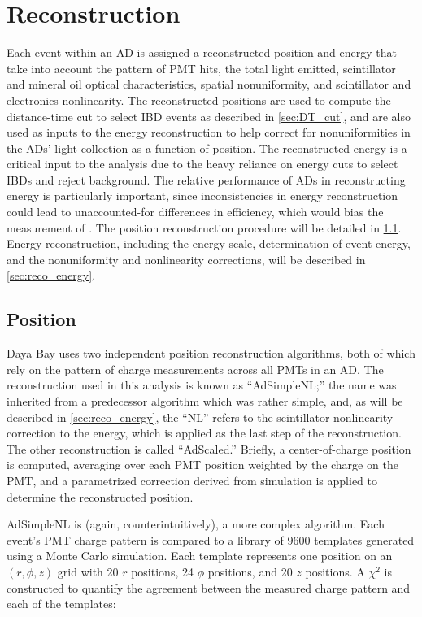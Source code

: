 \chapter{Reconstruction}
\label{ch:reconstruction}

Each event within an AD is assigned a reconstructed position and energy
that take into account the pattern of PMT hits, the total light emitted,
scintillator and mineral oil optical characteristics,
spatial nonuniformity, and scintillator and electronics nonlinearity.
The reconstructed positions are used to compute the distance-time cut
to select IBD events as described in \cref{sec:DT_cut},
and are also used as inputs to the energy reconstruction
to help correct for nonuniformities in the ADs' light collection
as a function of position.
The reconstructed energy is a critical input to the \thetaot{} analysis
due to the heavy reliance on energy cuts to select IBDs and reject background.
The relative performance of ADs in reconstructing energy
is particularly important, since inconsistencies in energy reconstruction
could lead to unaccounted-for differences in efficiency,
which would bias the measurement of \thetaot.
The position reconstruction procedure will be detailed in \cref{sec:reco_position}.
Energy reconstruction, including the energy scale, determination of event energy,
and the nonuniformity and nonlinearity corrections,
will be described in \cref{sec:reco_energy}.

\section{Position}
\label{sec:reco_position}

Daya Bay uses two independent position reconstruction algorithms,
both of which rely on the pattern of charge measurements across all PMTs in an AD.
The reconstruction used in this \thetaot{} analysis is known as ``AdSimpleNL;''
the name was inherited from a predecessor algorithm which was rather simple,
and, as will be described in \cref{sec:reco_energy}, the ``NL'' refers to the
scintillator nonlinearity correction to the energy,
which is applied as the last step of the reconstruction.
The other reconstruction is called ``AdScaled.''
Briefly, a center-of-charge position is computed,
averaging over each PMT position weighted by the charge on the PMT,
and a parametrized correction derived from simulation
is applied to determine the reconstructed position.

AdSimpleNL is (again, counterintuitively), a more complex algorithm.
Each event's PMT charge pattern is compared to a library of \num{9600} templates
generated using a Monte Carlo simulation.
Each template represents one position on an $(r, \phi, z)$ grid
with \num{20} $r$ positions, \num{24} $\phi$ positions,
and \num{20} $z$ positions.
A $\chi^2$ is constructed to quantify the agreement between the measured charge pattern
and each of the templates:

